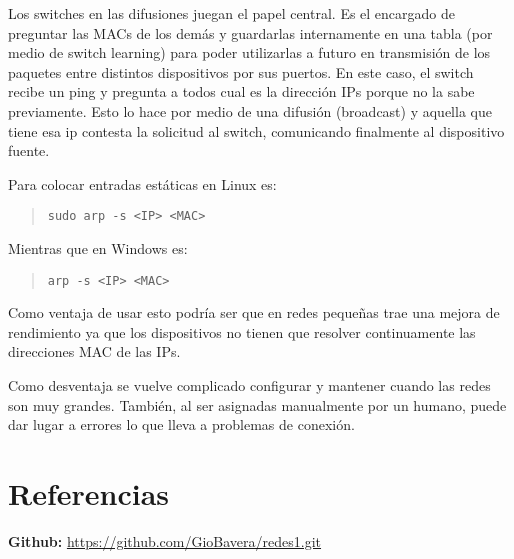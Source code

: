 \documentclass{article}
\begin{document}
Los switches en las difusiones juegan el papel central. Es el encargado de preguntar las MACs de los demás y guardarlas internamente en una tabla (por medio de switch learning) para poder utilizarlas a futuro en transmisión de los paquetes entre distintos dispositivos por sus puertos. 
En este caso, el switch recibe un ping y pregunta a todos cual es la dirección IPs porque no la sabe previamente. Esto lo hace por medio de una difusión (broadcast) y aquella que tiene esa ip contesta la solicitud al switch, comunicando finalmente al dispositivo fuente. 

Para colocar entradas estáticas en Linux es:


\begin{quote}
\texttt{sudo arp -s <IP> <MAC>}
\end{quote}

Mientras que en Windows es:

\begin{quote}
\texttt{arp -s <IP> <MAC>}
\end{quote}

Como ventaja de usar esto podría ser que en redes pequeñas trae una mejora de rendimiento ya que los dispositivos no tienen que resolver continuamente las direcciones MAC de las IPs. 

Como desventaja se vuelve complicado configurar y mantener cuando las redes son muy grandes. También, al ser asignadas manualmente por un humano, puede dar lugar a errores lo que lleva a problemas de conexión. 


\section{Referencias}

\textbf{Github:} \url{https://github.com/GioBavera/redes1.git}
\end{document}
